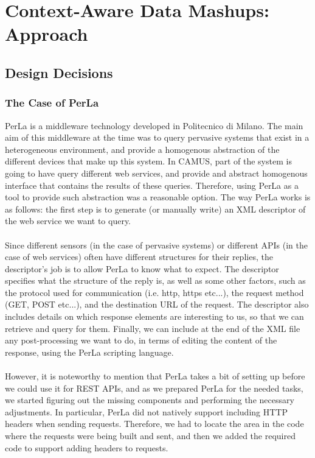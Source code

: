 \chapter{Context-Aware Data Mashups: Approach}
\label{capitolo4}
\thispagestyle{empty}

\section{Design Decisions}
\subsection{The Case of PerLa}
PerLa is a middleware technology developed in Politecnico di Milano. The main aim of this middleware at the time was to query pervasive systems that exist in a heterogeneous environment, and provide a homogenous abstraction of the different devices that make up this system. In CAMUS, part of the system is going to have query different web services, and provide and abstract homogenous interface that contains the results of these queries. Therefore, using PerLa as a tool to provide such abstraction was a reasonable option. The way PerLa works is as follows: the first step is to generate (or manually write) an XML descriptor of the web service we want to query.\\\\
Since different sensors (in the case of pervasive systems) or different APIs (in the case of web services) often have different structures for their replies, the descriptor's job is to allow PerLa to know what to expect. The descriptor specifies what the structure of the reply is, as well as some other factors, such as the protocol used for communication (i.e. http, https etc...), the request method (GET, POST etc...), and the destination URL of the request. The descriptor also includes details on which response elements are interesting to us, so that we can retrieve and query for them. Finally, we can include at the end of the XML file any post-processing we want to do, in terms of editing the content of the response, using the PerLa scripting language.\\\\
However, it is noteworthy to mention that PerLa takes a bit of setting up before we could use it for REST APIs, and as we prepared PerLa for the needed tasks, we started figuring out the missing components and performing the necessary adjustments. In particular, PerLa did not natively support including HTTP headers when sending requests. Therefore, we had to locate the area in the code where the requests were being built and sent, and then we added the required code to support adding headers to requests.

